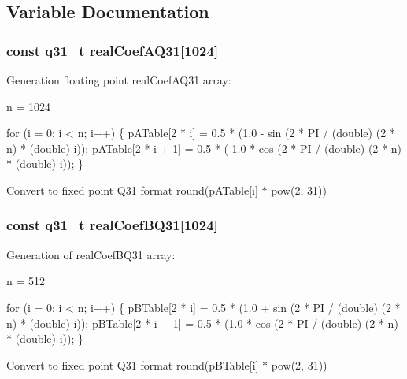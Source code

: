 \subsection{Variable Documentation}
\hypertarget{group___r_f_f_t___r_i_f_f_t_gacebced5a9d92f1913a0afe2adef7a886}{
\subsubsection[{real\-Coef\-A\-Q31}]{\setlength{\rightskip}{0pt plus 5cm}const q31\-\_\-t real\-Coef\-A\-Q31\mbox{[}1024\mbox{]}}}\label{group___r_f_f_t___r_i_f_f_t_gacebced5a9d92f1913a0afe2adef7a886}
\begin{DoxyParagraph}{}
Generation floating point real\-Coef\-A\-Q31 array\-: 
\end{DoxyParagraph}
\begin{DoxyParagraph}{}
n = 1024 
\begin{DoxyPre}for (i = 0; i < n; i++)   
\{   
   pATable[2 * i] = 0.5 * (1.0 - sin (2 * PI / (double) (2 * n) * (double) i));   
   pATable[2 * i + 1] = 0.5 * (-1.0 * cos (2 * PI / (double) (2 * n) * (double) i));   
\}\end{DoxyPre}
 
\end{DoxyParagraph}
\begin{DoxyParagraph}{}
Convert to fixed point Q31 format round(p\-A\-Table\mbox{[}i\mbox{]} $\ast$ pow(2, 31)) 
\end{DoxyParagraph}
\hypertarget{group___r_f_f_t___r_i_f_f_t_gaa3baee87ab9cc94a81d63135a004a3be}{
\subsubsection[{real\-Coef\-B\-Q31}]{\setlength{\rightskip}{0pt plus 5cm}const q31\-\_\-t real\-Coef\-B\-Q31\mbox{[}1024\mbox{]}}}\label{group___r_f_f_t___r_i_f_f_t_gaa3baee87ab9cc94a81d63135a004a3be}
\begin{DoxyParagraph}{}
Generation of real\-Coef\-B\-Q31 array\-: 
\end{DoxyParagraph}
\begin{DoxyParagraph}{}
n = 512 
\begin{DoxyPre}for (i = 0; i < n; i++)   
\{   
   pBTable[2 * i] = 0.5 * (1.0 + sin (2 * PI / (double) (2 * n) * (double) i));   
   pBTable[2 * i + 1] = 0.5 * (1.0 * cos (2 * PI / (double) (2 * n) * (double) i));   
\} \end{DoxyPre}
 
\end{DoxyParagraph}
\begin{DoxyParagraph}{}
Convert to fixed point Q31 format round(p\-B\-Table\mbox{[}i\mbox{]} $\ast$ pow(2, 31)) 
\end{DoxyParagraph}
